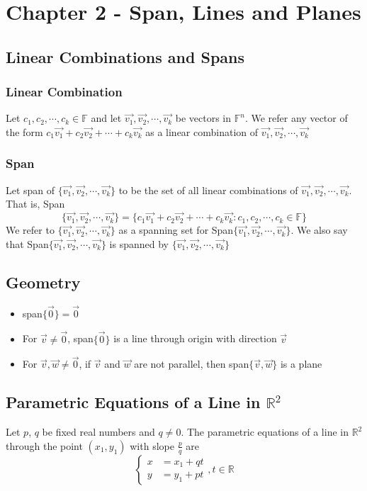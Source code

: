 \documentclass[12pt, letterpaper]{article}
\begin{document}
\section{Chapter 2 - Span, Lines and Planes}
\subsection{Linear Combinations and Spans}
\subsubsection{Linear Combination}
Let $c_1, c_2, \cdots, c_k\in\mathbb{F}$ and let $\vec{v_1}, \vec{v_2}, \cdots, \vec{v_k}$ be vectors in 
$\mathbb{F}^n$. We refer any vector of the form $c_1\vec{v_1} + c_2\vec{v_2} + \cdots + c_k\vec{v_k}$ as 
a linear combination of $\vec{v_1}, \vec{v_2}, \cdots, \vec{v_k}$
\subsubsection{Span}
Let span of $\{\vec{v_1}, \vec{v_2}, \cdots, \vec{v_k}\}$ to be the set of all linear combinations of 
$\vec{v_1}, \vec{v_2}, \cdots, \vec{v_k}$. That is, Span\[\{\vec{v_1}, \vec{v_2}, \cdots, \vec{v_k}\} = \{c_1\vec{v_1} + c_2\vec{v_2} + \cdots + c_k\vec{v_k} : c_1, c_2, \cdots, c_k\in\mathbb{F}\}\]
We refer to $\{\vec{v_1}, \vec{v_2}, \cdots, \vec{v_k}\}$ as a spanning set for Span$\{\vec{v_1}, \vec{v_2}, \cdots, \vec{v_k}\}$. 
We also say that Span$\{\vec{v_1}, \vec{v_2}, \cdots, \vec{v_k}\}$ is spanned by $\{\vec{v_1}, \vec{v_2}, \cdots, \vec{v_k}\}$
\subsection{Geometry}
\begin{itemize}
    \item span$\{\vec{0}\} = \vec{0}$
    \item For $\vec{v}\neq\vec{0}$, span$\{\vec{0}\}$ is a line through origin with direction $\vec{v}$
    \item For $\vec{v}, \vec{w}\neq\vec{0}$, if $\vec{v}$ and $\vec{w}$ are not parallel, then span$\{\vec{v}, \vec{w}\}$ is a plane
\end{itemize}
\subsection{Parametric Equations of a Line in $\mathbb{R}^2$}
Let $p$, $q$ be fixed real numbers and $q\neq0$. The parametric equations of a line in $\mathbb{R}^2$ through the 
point $(x_1, y_1)$ with slope $\frac{p}{q}$ are 
\[\begin{cases}
    x &= x_1 + qt \\
    y &= y_1 + pt
\end{cases}, t\in\mathbb{R}\]
\end{document}
